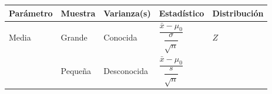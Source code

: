 \documentclass[]{book}
\begin{document}
\begin{longtable}[]{@{}lllll@{}}
\toprule
\begin{minipage}[b]{0.05\columnwidth}\raggedright\strut
Parámetro\strut
\end{minipage} & \begin{minipage}[b]{0.05\columnwidth}\raggedright\strut
Muestra\strut
\end{minipage} & \begin{minipage}[b]{0.05\columnwidth}\raggedright\strut
Varianza(s)\strut
\end{minipage} & \begin{minipage}[b]{0.05\columnwidth}\raggedright\strut
Estadístico\strut
\end{minipage} & \begin{minipage}[b]{0.05\columnwidth}\raggedright\strut
Distribución\strut
\end{minipage}\tabularnewline
\midrule
\endhead
\begin{minipage}[t]{0.05\columnwidth}\raggedright\strut
Media\strut
\end{minipage} & \begin{minipage}[t]{0.05\columnwidth}\raggedright\strut
Grande\strut
\end{minipage} & \begin{minipage}[t]{0.05\columnwidth}\raggedright\strut
Conocida\strut
\end{minipage} & \begin{minipage}[t]{0.05\columnwidth}\raggedright\strut
\(\dfrac{\bar{x}-\mu_0}{\dfrac{\sigma}{\sqrt{n}}}\)\strut
\end{minipage} & \begin{minipage}[t]{0.05\columnwidth}\raggedright\strut
\(Z\)\strut
\end{minipage}\tabularnewline
\begin{minipage}[t]{0.05\columnwidth}\raggedright\strut
\strut
\end{minipage} & \begin{minipage}[t]{0.05\columnwidth}\raggedright\strut
Pequeña\strut
\end{minipage} & \begin{minipage}[t]{0.05\columnwidth}\raggedright\strut
Desconocida\strut
\end{minipage} & \begin{minipage}[t]{0.05\columnwidth}\raggedright\strut
\(\dfrac{\bar{x}-\mu_0}{\dfrac{s}{\sqrt{n}}}\)\strut
\end{minipage} & \begin{minipage}[t]{0.05\columnwidth}\raggedright\strut

\end{minipage}
\end{longtable}
\end{document}
